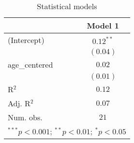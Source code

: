 
\begin{table}
\begin{center}
\begin{tabular}{l c}
\hline
 & Model 1 \\
\hline
(Intercept)   & $0.12^{**}$ \\
              & $(0.04)$    \\
age\_centered & $0.02$      \\
              & $(0.01)$    \\
\hline
R$^2$         & $0.12$      \\
Adj. R$^2$    & $0.07$      \\
Num. obs.     & $21$        \\
\hline
\multicolumn{2}{l}{\scriptsize{$^{***}p<0.001$; $^{**}p<0.01$; $^{*}p<0.05$}}
\end{tabular}
\caption{Statistical models}
\label{table:coefficients}
\end{center}
\end{table}

